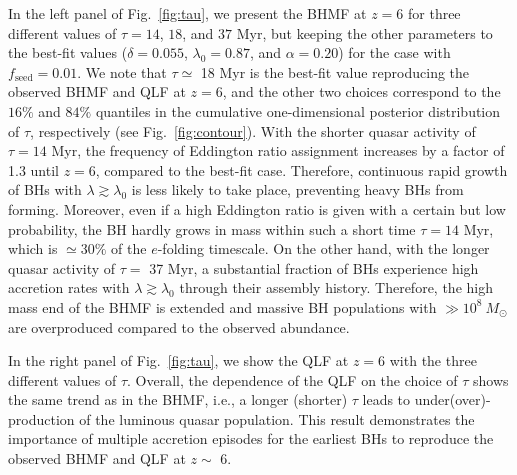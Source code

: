 \documentclass[twocolumn, twocolappendix]{aastex63}
\newcommand{\Msun}{M_\odot}
\newcommand{\tlife}{\tau}
\newcommand{\fseed}{f_\mathrm{seed}}
\begin{document}
\begin{CJK*}{UTF8}{gbsn}
In the left panel of Fig.~\ref{fig:tau}, we present the BHMF at $z=6$ for three different values of $\tlife=14$, $18$, and $37$ Myr,
but keeping the other parameters to the best-fit values ($\delta=0.055$, $\lambda_0=0.87$, and $\alpha=0.20$) for the case with $\fseed=0.01$.
We note that $\tlife \simeq$ 18 Myr is the best-fit value reproducing the observed BHMF and QLF at $z=6$,
and the other two choices correspond to the $16\%$ and $84\%$ quantiles in the cumulative one-dimensional posterior distribution of $\tau$, respectively (see Fig.~\ref{fig:contour}).
With the shorter quasar activity of $\tlife=14$ Myr, the frequency of Eddington ratio assignment increases by a factor of 1.3 until $z=6$, compared to the best-fit case.
Therefore, continuous rapid growth of BHs with $\lambda \gtrsim \lambda_0$ is less likely to take place,
preventing heavy BHs from forming.
Moreover, even if a high Eddington ratio is given with a certain but low probability, the BH hardly grows in mass within such a short time $\tlife=14$ Myr,
which is $\simeq 30\%$ of the $e$-folding timescale.
On the other hand, with the longer quasar activity of $\tlife=$ 37 Myr, a substantial fraction of BHs experience high accretion rates with $\lambda\gtrsim \lambda_0$
through their assembly history.
Therefore, the high mass end of the BHMF is extended and massive BH populations with $\gg 10^8~\Msun$ are overproduced compared to the observed abundance.

In the right panel of Fig.~\ref{fig:tau}, we show the QLF at $z=6$ with the three different values of $\tau$.
Overall, the dependence of the QLF on the choice of $\tau$ shows the same trend as in the BHMF,
i.e., a longer (shorter) $\tlife$ leads to under(over)-production of the luminous quasar population.
This result demonstrates the importance of multiple accretion episodes for the earliest BHs to
reproduce the observed BHMF and QLF at $z\sim$ 6.





\vspace{100mm}
{}




\end{CJK*}
\end{document}
